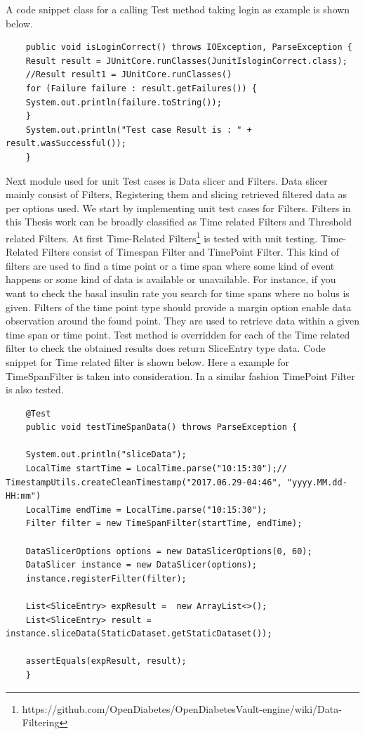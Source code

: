 \documentclass[article,type=msc,colorback,accentcolor=tud9c,twoside,11pt]{tudthesis}
\begin{document}
	A code snippet class for a calling Test method taking login as example is shown below.
	\begin{lstlisting}
	public void isLoginCorrect() throws IOException, ParseException {
	Result result = JUnitCore.runClasses(JunitIsloginCorrect.class);
	//Result result1 = JUnitCore.runClasses()
	for (Failure failure : result.getFailures()) {
	System.out.println(failure.toString());
	}
	System.out.println("Test case Result is : " + result.wasSuccessful());
	}
	\end{lstlisting}
	
	Next module used for unit Test cases is Data slicer and Filters. Data slicer mainly consist of Filters, Registering them and slicing retrieved filtered data as per options used. We start by implementing unit test cases for Filters. Filters in this Thesis work can be broadly classified as Time related Filters and Threshold related Filters. At first Time-Related Filters\footnote{https://github.com/OpenDiabetes/OpenDiabetesVault-engine/wiki/Data-Filtering} is tested with unit testing. Time-Related Filters consist of Timespan Filter and TimePoint Filter. This kind of filters are used to find a time point or a time span where some kind of event happens or some kind of data is available or unavailable. For instance, if you want to check the basal insulin rate you search for time spans where no bolus is given. Filters of the time point type should provide a margin option enable data observation around the found point. They are used to retrieve data within a given time span or time point. Test method is overridden for each of the Time related filter to check the obtained results does return SliceEntry type data. Code snippet for Time related filter is shown below. Here a example for TimeSpanFilter is taken into consideration. In a similar fashion TimePoint Filter is also tested.
	\begin{lstlisting}
	@Test
	public void testTimeSpanData() throws ParseException {
	
	System.out.println("sliceData");
	LocalTime startTime = LocalTime.parse("10:15:30");//  TimestampUtils.createCleanTimestamp("2017.06.29-04:46", "yyyy.MM.dd-HH:mm")
	LocalTime endTime = LocalTime.parse("10:15:30");
	Filter filter = new TimeSpanFilter(startTime, endTime);
	
	DataSlicerOptions options = new DataSlicerOptions(0, 60);
	DataSlicer instance = new DataSlicer(options);
	instance.registerFilter(filter);
	
	List<SliceEntry> expResult =  new ArrayList<>();
	List<SliceEntry> result = instance.sliceData(StaticDataset.getStaticDataset());
	
	assertEquals(expResult, result);
	}
	\end{lstlisting}
	
\end{document}
